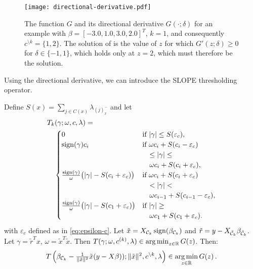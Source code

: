 \begin{figure}[htb]
  \centering
  \texttt{[image: directional-derivative.pdf]}
  \caption{%
  The function \(G\) and its directional derivative \(G( \cdot ; \delta)\) for
  an example with \(\beta = [-3.0, 1.0, 3.0, 2.0]^T\), \(k = 1\), and consequently
  \(c^{\setminus k} = \{1, 2\}\). The solution of  is the value of \(z\) for
      which \(G'(z; \delta) \geq 0 \) for \(\delta \in \{-1, 1\}\), which holds only
      at \(z = 2\), which must therefore be the solution.
    }
  \label{fig:directional-derivative}
\end{figure}

Using the directional derivative, we can introduce the SLOPE thresholding operator.

\begin{theorem}
  \label{thm:thresholding-operator}
  Define \(S(x) = \sum_{j \in C(x)}\lambda_{(j)^-_{x}}\) and
  let
  \[
    \begin{multlined}
      T_k(\gamma; \omega, c, \lambda) = \\
      \begin{cases}
        0
            & \text{if } |\gamma| \leq S(\varepsilon_c),               \\
        \sign(\gamma)c_i
            & \text{if } \omega c_i + S(c_i - \varepsilon_c)           \\
            & \quad \leq |\gamma| \leq                                 \\
            & \quad \omega c_i + S(c_i + \varepsilon_c),               \\
        \frac{\sign(\gamma)}{\omega} \big( |\gamma| - S(c_i + \varepsilon_c) \big)
            & \text{if } \omega c_i + S(c_i + {\varepsilon_c})         \\
            & \quad < |\gamma| <                                       \\
            & \quad \omega c_{i - 1} + S(c_{i - 1} - {\varepsilon_c}), \\
        \frac{\sign(\gamma)}{\omega} \big( |\gamma| - S(c_1 + {\varepsilon_c}) \big)
            & \text{if } |\gamma| \geq                                 \\
            & \quad \omega c_1 + S(c_1 + {\varepsilon_c}).
      \end{cases}
    \end{multlined}
  \]
  with \({\varepsilon_c}\) defined as in \eqref{eq:epsilon-c}.
  Let $\tilde x = X_{\mathcal{C}_k} \operatorname{sign}(\beta_{\mathcal{C}_k})$ and $\tilde r = y - X_{\bar {\mathcal{C}}_k} \beta_{\bar {\mathcal{C}}_k}$.
  Let \(\gamma = \tilde{r}^Tx\), \(\omega = \tilde{x}^T\tilde{x}\). Then
  \(T(\gamma; \omega, c^{(k)}, \lambda) \in \operatorname*{arg\,min}_{z \in \mathbb{R}} G(z)\).
  Then:
  \begin{equation}
    T \left(\beta_{\mathcal{C}_k} - \tfrac{1}{\Vert \tilde x \Vert^2} \tilde x (y - X\beta)); \Vert \tilde x \Vert^2, c^{\setminus k}, \lambda \right) \in \operatorname*{arg\,min}_{z \in \mathbb{R}} G(z) \,.
  \end{equation}
\end{theorem}

